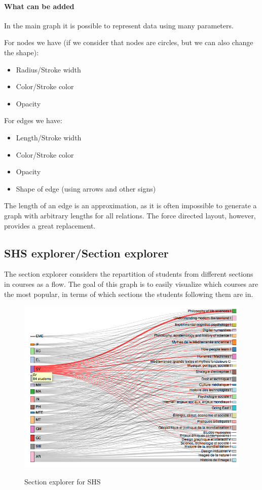 \paragraph{What can be added}
In the main graph it is possible to represent data using many parameters. 

For nodes we have (if we consider that nodes are circles, but we can also change the shape):
\begin{itemize}
\item Radius/Stroke width
\item Color/Stroke color
\item Opacity
\end{itemize}

For edges we have: 
\begin{itemize}
\item Length/Stroke width
\item Color/Stroke color
\item Opacity
\item Shape of edge (using arrows and other signs)
\end{itemize}

The length of an edge is an approximation, as it is often impossible to generate a graph with arbitrary lengths for all relations. The force directed layout, however, provides a great replacement. 

\subsection{SHS explorer/Section explorer}
The section explorer considers the repartition of students from different sections in courses as a flow. The goal of this graph is to easily visualize which  courses are the most popular,  in terms of which sections the students following them are in.

\begin{figure}[H]
\centering
\includegraphics[width=\textwidth]{images/view_shs_SV}
\label{fig:global}
\caption{Section explorer for SHS}
\end{figure}

